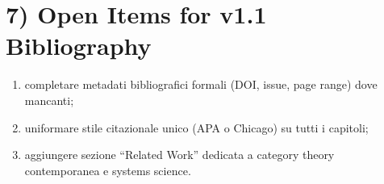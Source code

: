 \section{7) Open Items for v1.1 Bibliography}

\begin{enumerate}
\def\labelenumi{\arabic{enumi}.}
\tightlist
\item
  completare metadati bibliografici formali (DOI, issue, page range) dove mancanti;
\item
  uniformare stile citazionale unico (APA o Chicago) su tutti i capitoli;
\item
  aggiungere sezione ``Related Work'' dedicata a category theory contemporanea e systems science.
\end{enumerate}
